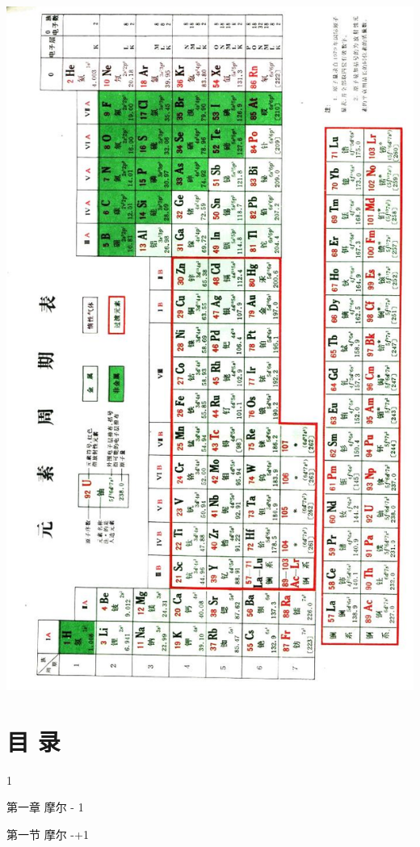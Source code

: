 \documentclass[10pt]{article}
\begin{document}
\begin{center}
\includegraphics[max width=1.0\textwidth]{images/01912d0f-097c-7e75-8f32-4f326cd86c9f_2_111233.jpg}
\end{center}

\section*{目 录}

1

第一章 摩尔 - 1

第一节 摩尔 -+1
\end{document}
